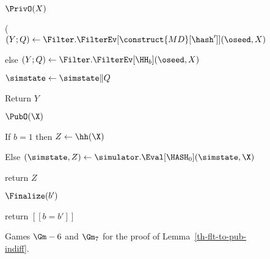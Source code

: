 \begin{figure}
{\begin{algorithm-subsequent}{$\PrivO(X)$}
			\item \quad ($(Y;Q) \gets \Filter.\FilterEv[\construct{MD}[\hash^{\prime}]](\oseed,X)$
			\item else $(Y;Q) \gets \Filter.\FilterEv[\HH_b](\oseed,X)$
			\item $\simstate\gets\simstate\|Q$  
			\item Return $Y$
		\end{algorithm-subsequent}	
		\ExptSepSpace
		\begin{algorithm-subsequent}{$\PubO(\X)$}
			\item If $b=1$ then  $Z\gets \hh(\X)$
			\item Else $(\simstate,Z) \gets \simulator.\Eval[\HASH_0] (\simstate,\X)$
			\item return $Z$
		\end{algorithm-subsequent}
		\ExptSepSpace
		\begin{algorithm-subsequent}{$\Finalize(b')$}
			\item return $[[b = b']]$
		\end{algorithm-subsequent}
	}
	\vspace{5pt}
	\caption{Games $\Gm-6$ and $\Gm_7$ for the proof of Lemma~\ref{th-flt-to-pub-indiff}.}
	\label{fig-md-indiff-gm567}
\end{figure}

